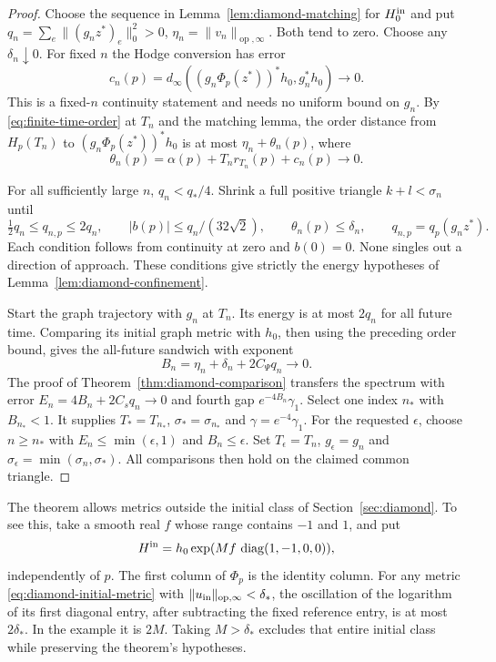 \documentclass[11pt]{amsart}
\theoremstyle{definition}
\theoremstyle{remark}
\newcommand{\diag}{\operatorname{diag}}
\newcommand{\op}{\operatorname{op}}
\begin{document}
\begin{proof}
Choose the sequence in Lemma~\ref{lem:diamond-matching} for
$H_0^{\rm in}$ and put
$q_n=\sum_e\|(g_nz^*)_e\|_0^2>0$,
$\eta_n=\|v_n\|_{\op,\infty}$.
Both tend to zero. Choose any $\delta_n\downarrow0$.
For fixed $n$ the Hodge conversion has error
\[
 c_n(p)=d_\infty((g_n\Phi_p(z^*))^*h_0,g_n^*h_0)\longrightarrow0 .
\]
This is a fixed-$n$ continuity statement and needs no uniform
bound on $g_n$. By \eqref{eq:finite-time-order} at $T_n$ and
the matching lemma, the order distance from $H_p(T_n)$ to
$(g_n\Phi_p(z^*))^*h_0$ is at most
$\eta_n+\theta_n(p)$, where
\[
 \theta_n(p)=\alpha(p)+T_nr_{T_n}(p)+c_n(p)\longrightarrow0.
\]

For all sufficiently large $n$, $q_n<q_*/4$. Shrink a full
positive triangle $k+l<\sigma_n$ until
\[
 \tfrac12q_n\le q_{n,p}\le2q_n,\qquad
 |b(p)|\le q_n/(32\sqrt2),\qquad
 \theta_n(p)\le\delta_n ,
 \qquad q_{n,p}=q_p(g_nz^*).
\]
Each condition follows from continuity at zero and $b(0)=0$.
None singles out a direction of approach. These conditions give
strictly the energy hypotheses of
Lemma~\ref{lem:diamond-confinement}.

Start the graph trajectory with $g_n$ at $T_n$.
Its energy is at most $2q_n$ for all future time. Comparing
its initial graph metric with $h_0$, then using the preceding
order bound, gives the all-future sandwich with exponent
\[
 B_n=\eta_n+\delta_n+2C_\Psi q_n\longrightarrow0 .
\]
The proof of Theorem~\ref{thm:diamond-comparison} transfers
the spectrum with error
$E_n=4B_n+2C_sq_n\to0$ and fourth gap
$e^{-4B_n}\gamma_1$. Select one index $n_*$ with $B_{n_*}<1$.
It supplies $T_*=T_{n_*}$, $\sigma_*=\sigma_{n_*}$ and
$\gamma=e^{-4}\gamma_1$. For the requested $\epsilon$, choose
$n\ge n_*$ with $E_n\le\min(\epsilon,1)$ and $B_n\le\epsilon$.
Set $T_\epsilon=T_n$, $g_\epsilon=g_n$ and
$\sigma_\epsilon=\min(\sigma_n,\sigma_*)$. All comparisons
then hold on the claimed common triangle.
\end{proof}

The theorem allows metrics outside the initial class of
Section~\ref{sec:diamond}. To see this, take a smooth real $f$
whose range contains $-1$ and $1$, and put
\[
 H^{\rm in}=h_0\exp(Mf\,\diag(1,-1,0,0)),
\]
independently of $p$.
The first column of $\Phi_p$ is the identity column. For any
metric \eqref{eq:diamond-initial-metric} with
$\|u_{\rm in}\|_{\op,\infty}<\delta_*$, the oscillation of the
logarithm of its first diagonal entry, after subtracting the
fixed reference entry, is at most $2\delta_*$. In the example
it is $2M$. Taking $M>\delta_*$ excludes that entire initial
class while preserving the theorem's hypotheses.
\end{document}
